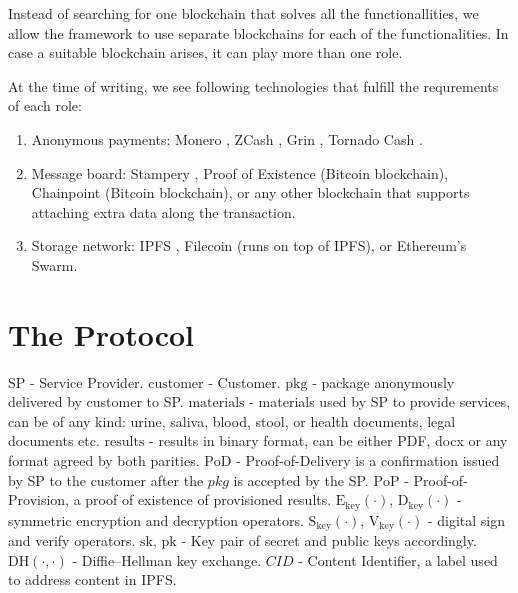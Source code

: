 \documentclass{ieeeaccess}
\begin{document}
Instead of searching for one blockchain that solves all the
functionallities, we allow the framework to use separate blockchains for
each of the functionalities. In case a suitable blockchain arises, it
can play more than one role.

At the time of writing, we see following technologies that fulfill the
requrements of each role:

\begin{enumerate}
\def\labelenumi{\arabic{enumi}.}

\item Anonymous payments: Monero \cite{van2013cryptonote}, ZCash
  \cite{sasson2014zerocash}, Grin \cite{fuchsbauer2019aggregate},
  Tornado Cash \cite{pertsev2019tornado}.
\item Message board: Stampery \cite{de2016stampery}, Proof of Existence
  \cite{proofofexistence} (Bitcoin blockchain), Chainpoint
  \cite{Chainpoi39} (Bitcoin blockchain), or any other blockchain that
  supports attaching extra data along the transaction.
\item Storage network: IPFS \cite{benet2014ipfs}, Filecoin
  \cite{benetfilecoin} (runs on top of IPFS), or Ethereum's
  Swarm\cite{swarmwhi49}.
\end{enumerate}



\section{The Protocol}

\(\mathrm{SP}\) - Service Provider. \(\mathrm{customer}\) - Customer.
\(\mathrm{pkg}\) - package anonymously delivered by customer to SP.
\(\mathrm{materials}\) - materials used by SP to provide services, can
be of any kind: urine, saliva, blood, stool, or health documents, legal
documents etc. \(\mathrm{results}\) - results in binary format, can be
either PDF, docx or any format agreed by both parities. \(\mathrm{PoD}\)
- Proof-of-Delivery is a confirmation issued by SP to the customer after
the \(pkg\) is accepted by the SP. \(\mathrm{PoP}\) -
Proof-of-Provision, a proof of existence of provisioned results.
\(\mathrm{E}_\mathrm{key}(\cdot)\), \(\mathrm{D}_\mathrm{key}(\cdot)\) -
symmetric encryption and decryption operators.
\(\mathrm{S}_\mathrm{key}(\cdot)\), \(\mathrm{V}_\mathrm{key}(\cdot)\) -
digital sign and verify operators. \(\mathrm{sk}\), \(\mathrm{pk}\) -
Key pair of secret and public keys accordingly.
\(\mathrm{DH}(\cdot, \cdot)\) - Diffie--Hellman key exchange. \(CID\) -
Content Identifier, a label used to address content in IPFS.
\end{document}

